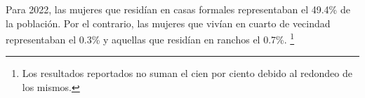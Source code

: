 \justifying Para 2022, las mujeres que residían en casas formales representaban el 49.4\% de la población. Por el contrario, las mujeres que vivían en cuarto de vecindad representaban el 0.3\% y aquellas que residían en ranchos el 0.7\%. \footnote{Los resultados reportados no suman el cien por ciento debido al redondeo de los mismos.}